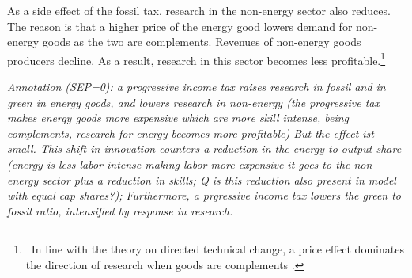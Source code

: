 As a side effect of the fossil tax, research in the non-energy sector also reduces. The reason is that a higher price of the energy good lowers demand for non-energy goods as the two are complements. Revenues of  non-energy goods producers decline. As a result, research in this sector becomes less profitable.\footnote{\ In line with the theory on directed technical change, a price effect dominates the direction of research when goods are complements \citep{Hemous2021DirectedEconomics}.} 
 


 \textit{Annotation (SEP=0):  a progressive income tax raises research in fossil and in green \ar in energy goods, and lowers research in non-energy (the progressive tax makes energy goods more expensive which are more skill intense, being complements, research for energy becomes more profitable) But the effect ist small. This shift in innovation counters a reduction in the energy to output share (energy is less labor intense making labor more expensive it goes to the non-energy sector plus a reduction in skills; Q is this reduction also present in model with equal cap shares?); Furthermore, a prgressive income tax lowers the green to fossil ratio, intensified by response in research.  }
 
